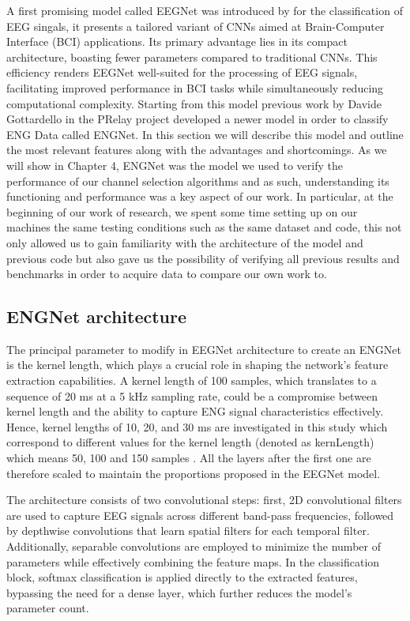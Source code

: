 \documentclass{Configuration_Files/PoliMi3i_thesis}
\begin{document}
A first promising model called EEGNet was introduced by \cite{lawhernEEGNetCompactConvolutional2018} for the classification of EEG singals, it presents a tailored variant of CNNs aimed at Brain-Computer Interface (BCI) applications. Its primary advantage lies in its compact architecture, boasting fewer parameters compared to traditional CNNs. This efficiency renders EEGNet well-suited for the processing of EEG signals, facilitating improved performance in BCI tasks while simultaneously reducing computational complexity. \cite{tesiDavide}
Starting from this model previous work by Davide Gottardello in the PRelay project developed a newer model in order to classify ENG Data called ENGNet.
In this section we will describe this model and outline the most relevant features along with the advantages and shortcomings.
As we will show in Chapter 4, ENGNet was the model we used to verify the performance of our channel selection algorithms and as such, understanding its functioning and performance was a key aspect of our work.
In particular, at the beginning of our work of research, we spent some time setting up on our machines the same testing conditions such as the same dataset and code, this not only allowed us to gain familiarity with the architecture of the model and previous code but also gave us the possibility of verifying all previous results and benchmarks in order to acquire data to compare our own work to. 

\subsection{ENGNet architecture}

The principal parameter to modify in EEGNet architecture to create an ENGNet is the kernel length, which plays a crucial role in shaping the network’s feature extraction capabilities. \cite{tesiDavide}
A kernel length of 100 samples, which translates to a sequence of 20 ms at a 5 kHz sampling rate, could be a compromise between kernel length and the ability to capture ENG signal characteristics effectively. Hence, kernel lengths of 10, 20, and 30 ms are investigated in this study which correspond to different values for the kernel length (denoted as kernLength) which means 50, 100 and 150 samples \cite{tesiDavide}.
All the layers after the first one are therefore scaled to maintain the proportions proposed in the EEGNet model.


The architecture consists of two convolutional steps: first, 2D convolutional filters are used to capture EEG signals across different band-pass frequencies, followed by depthwise convolutions that learn spatial filters for each temporal filter. Additionally, separable convolutions are employed to minimize the number of parameters while effectively combining the feature maps. In the classification block, softmax classification is applied directly to the extracted features, bypassing the need for a dense layer, which further reduces the model's parameter count. \cite{tesiDavide}
\end{document}
